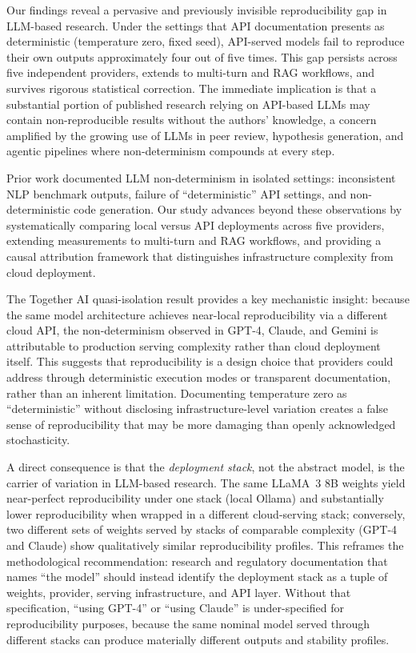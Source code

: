 \documentclass[sn-nature]{sn-jnl}
\begin{document}
Our findings reveal a pervasive and previously invisible reproducibility gap in LLM-based research.
Under the settings that API documentation presents as deterministic (temperature zero, fixed seed), API-served models fail to reproduce their own outputs approximately four out of five times.
This gap persists across five independent providers, extends to multi-turn and RAG workflows, and survives rigorous statistical correction.
The immediate implication is that a substantial portion of published research relying on API-based LLMs may contain non-reproducible results without the authors' knowledge, a concern amplified by the growing use of LLMs in peer review\cite{thakkar2026llm}, hypothesis generation\cite{xin2025agentic}, and agentic pipelines where non-determinism compounds at every step.

Prior work documented LLM non-determinism in isolated settings: inconsistent NLP benchmark outputs\cite{chen2023chatgpt}, failure of ``deterministic'' API settings\cite{atil2024nondeterminism}, and non-deterministic code generation\cite{ouyang2024nondeterminism}.
Our study advances beyond these observations by systematically comparing local versus API deployments across five providers, extending measurements to multi-turn and RAG workflows, and providing a causal attribution framework that distinguishes infrastructure complexity from cloud deployment.

The Together AI quasi-isolation result provides a key mechanistic insight: because the same model architecture achieves near-local reproducibility via a different cloud API, the non-determinism observed in GPT-4, Claude, and Gemini is attributable to production serving complexity rather than cloud deployment itself.
This suggests that reproducibility is a design choice that providers could address through deterministic execution modes or transparent documentation, rather than an inherent limitation.
Documenting temperature zero as ``deterministic'' without disclosing infrastructure-level variation creates a false sense of reproducibility that may be more damaging than openly acknowledged stochasticity.

A direct consequence is that the \emph{deployment stack}, not the abstract model, is the carrier of variation in LLM-based research.
The same LLaMA~3 8B weights yield near-perfect reproducibility under one stack (local Ollama) and substantially lower reproducibility when wrapped in a different cloud-serving stack; conversely, two different sets of weights served by stacks of comparable complexity (GPT-4 and Claude) show qualitatively similar reproducibility profiles.
This reframes the methodological recommendation: research and regulatory documentation that names ``the model'' should instead identify the deployment stack as a tuple of weights, provider, serving infrastructure, and API layer.
Without that specification, ``using GPT-4'' or ``using Claude'' is under-specified for reproducibility purposes, because the same nominal model served through different stacks can produce materially different outputs and stability profiles.
\end{document}
